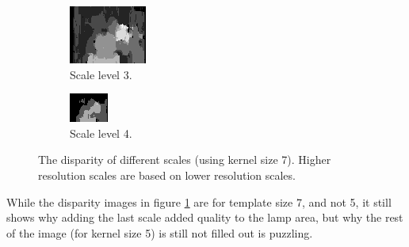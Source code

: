 \documentclass[12pt,a4paper,oneside,final]{article}
\begin{document}
{\begin{figure}[H]
\begin{subfigure}[b]{0.24\textwidth}
				\includegraphics[width=\textwidth]{disparity3set_1.png}
				\caption{Scale level 3.}
			\end{subfigure}
			\begin{subfigure}[b]{0.24\textwidth}
				\includegraphics[width=\textwidth]{disparity4set_1.png}
				\caption{Scale level 4.}
			\end{subfigure}
			\caption{The disparity of different scales (using kernel size 7). Higher resolution scales are based on lower resolution scales.}
			\label{fig:lowlevel}
		\end{figure}
		While the disparity images in figure \ref{fig:lowlevel} are for template size 7, and not 5, it still shows why adding the last scale added quality to the lamp area, but why the rest of the image (for kernel size 5) is still not filled out is puzzling.}
\end{document}
